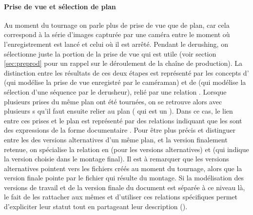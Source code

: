 \paragraph{Prise de vue et sélection de plan}
Au moment du tournage on parle plus de prise de vue que de plan, car cela correspond à la série d'images capturée par une caméra entre le moment où l'enregistrement est lancé et celui où il est arrêté.
Pendant le derushing, on sélectionne juste la portion de la prise de vue qui est utile (voir section \ref{sec:preprod} pour un rappel sur le déroulement de la chaîne de production).
La distinction entre les résultats de ces deux étapes est représenté par les concepts d' (qui modélise la prise de vue enregistré par le caméraman) et de  (qui modélise la sélection d'une séquence par le derusheur), relié par une relation .
Lorsque plusieurs prises du même plan ont été tournées, on se retrouve alors avec plusieurs s qu'il faut ensuite relier au plan ( qui est un ).
Dans ce cas, le lien entre ces prises et le plan est représenté par des relations  indiquant que les  sont des expressions de la forme documentaire .
Pour être plus précis et distinguer entre les des versions alternatives d'un même plan, et la version finalement retenue, on spécialise la relation  en  (pour les versions alternatives) et  (qui indique la version choisie dans le montage final).
Il est à remarquer que les versions alternatives pointent vers les fichiers créés au moment du tournage, alors que la version finale pointe par le fichier qui résulte du montage. 
Si la modélisation des versions de travail et de la version finale du document est séparée à ce niveau là, le fait de les rattacher aux mêmes  et d'utiliser ces relations spécifiques permet d'expliciter leur statut tout en partageant leur description (). 



